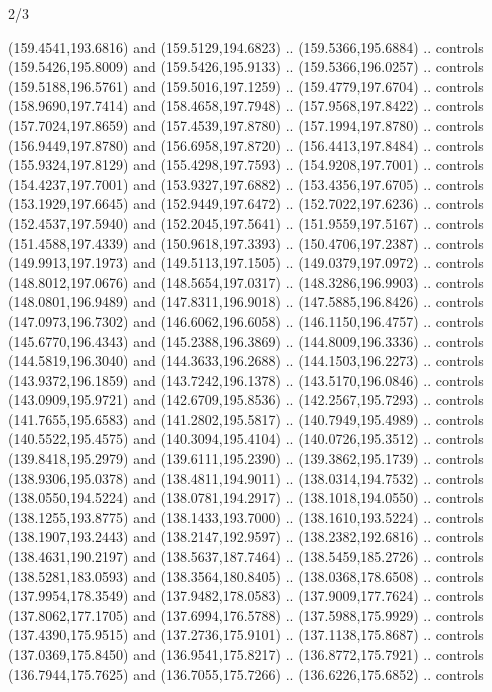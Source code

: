 \begin{flagdescription}{2/3}
\begin{scope}[shift={(0.5\flaglength,0.5)},scale=\flagwidth/320]
\begin{scope}[y=0.8pt, x=0.8pt, yscale=-1,shift={(-118.3,-146)}]
  (159.4541,193.6816) and (159.5129,194.6823) .. (159.5366,195.6884) .. controls
  (159.5426,195.8009) and (159.5426,195.9133) .. (159.5366,196.0257) .. controls
  (159.5188,196.5761) and (159.5016,197.1259) .. (159.4779,197.6704) .. controls
  (158.9690,197.7414) and (158.4658,197.7948) .. (157.9568,197.8422) .. controls
  (157.7024,197.8659) and (157.4539,197.8780) .. (157.1994,197.8780) .. controls
  (156.9449,197.8780) and (156.6958,197.8720) .. (156.4413,197.8484) .. controls
  (155.9324,197.8129) and (155.4298,197.7593) .. (154.9208,197.7001) .. controls
  (154.4237,197.7001) and (153.9327,197.6882) .. (153.4356,197.6705) .. controls
  (153.1929,197.6645) and (152.9449,197.6472) .. (152.7022,197.6236) .. controls
  (152.4537,197.5940) and (152.2045,197.5641) .. (151.9559,197.5167) .. controls
  (151.4588,197.4339) and (150.9618,197.3393) .. (150.4706,197.2387) .. controls
  (149.9913,197.1973) and (149.5113,197.1505) .. (149.0379,197.0972) .. controls
  (148.8012,197.0676) and (148.5654,197.0317) .. (148.3286,196.9903) .. controls
  (148.0801,196.9489) and (147.8311,196.9018) .. (147.5885,196.8426) .. controls
  (147.0973,196.7302) and (146.6062,196.6058) .. (146.1150,196.4757) .. controls
  (145.6770,196.4343) and (145.2388,196.3869) .. (144.8009,196.3336) .. controls
  (144.5819,196.3040) and (144.3633,196.2688) .. (144.1503,196.2273) .. controls
  (143.9372,196.1859) and (143.7242,196.1378) .. (143.5170,196.0846) .. controls
  (143.0909,195.9721) and (142.6709,195.8536) .. (142.2567,195.7293) .. controls
  (141.7655,195.6583) and (141.2802,195.5817) .. (140.7949,195.4989) .. controls
  (140.5522,195.4575) and (140.3094,195.4104) .. (140.0726,195.3512) .. controls
  (139.8418,195.2979) and (139.6111,195.2390) .. (139.3862,195.1739) .. controls
  (138.9306,195.0378) and (138.4811,194.9011) .. (138.0314,194.7532) .. controls
  (138.0550,194.5224) and (138.0781,194.2917) .. (138.1018,194.0550) .. controls
  (138.1255,193.8775) and (138.1433,193.7000) .. (138.1610,193.5224) .. controls
  (138.1907,193.2443) and (138.2147,192.9597) .. (138.2382,192.6816) .. controls
  (138.4631,190.2197) and (138.5637,187.7464) .. (138.5459,185.2726) .. controls
  (138.5281,183.0593) and (138.3564,180.8405) .. (138.0368,178.6508) .. controls
  (137.9954,178.3549) and (137.9482,178.0583) .. (137.9009,177.7624) .. controls
  (137.8062,177.1705) and (137.6994,176.5788) .. (137.5988,175.9929) .. controls
  (137.4390,175.9515) and (137.2736,175.9101) .. (137.1138,175.8687) .. controls
  (137.0369,175.8450) and (136.9541,175.8217) .. (136.8772,175.7921) .. controls
  (136.7944,175.7625) and (136.7055,175.7266) .. (136.6226,175.6852) .. controls

\end{scope}
\end{scope}
\end{flagdescription}
